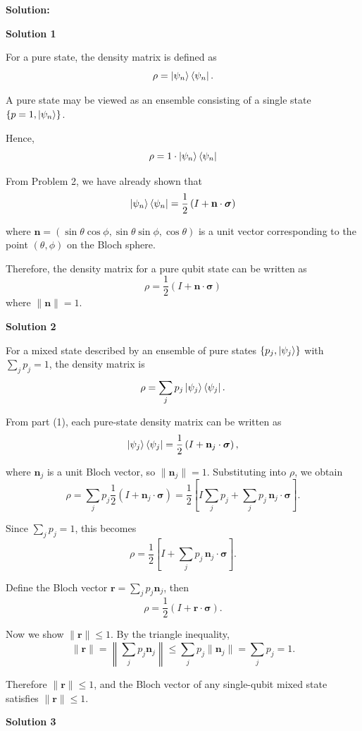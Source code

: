 \documentclass[11pt]{article}
\newenvironment{solution}
{\par\noindent\textbf{Solution:}\par}
{\vspace{1em}}
\begin{document}
\begin{solution}

\textbf{Solution 1}

For a pure state, the density matrix is defined as\[\rho = \ket{\psi_n}\bra{\psi_n}.\]
    
A pure state may be viewed as an ensemble consisting of a single state \(\{p=1, \ket{\psi_n}\}\).
    
Hence, \[\rho = 1\cdot \ket{\psi_n}\bra{\psi_n}\]
    
From Problem 2, we have already shown that \[\ket{\psi_n}\bra{\psi_n}=\frac12 \left(I+\mathbf n\cdot\boldsymbol{\sigma}\right)\]

where \(\mathbf n=(\sin\theta\cos\phi,\sin\theta\sin\phi,\cos\theta)\) is a unit vector corresponding to the point \((\theta,\phi)\) on the Bloch sphere.

Therefore, the density matrix for a pure qubit state can be written as \[\rho=\frac12\left(I+\mathbf n\cdot\boldsymbol{\sigma}\right)\]
where \(\boxed{\|\mathbf n\|=1}\).

\textbf{Solution 2}

For a mixed state described by an ensemble of pure states $\{p_j, \ket{\psi_j}\}$ with $\sum_j p_j=1$, the density matrix is \[\rho=\sum_j p_j \ket{\psi_j}\bra{\psi_j}.\]

From part (1), each pure-state density matrix can be written as \[\ket{\psi_j}\bra{\psi_j} = \frac12\left(I+\mathbf n_j\cdot\boldsymbol{\sigma}\right),\]

where $\mathbf n_j$ is a unit Bloch vector, so $\|\mathbf n_j\|=1$. Substituting into $\rho$, we obtain \[\rho = \sum_j p_j \frac12\left(I+\mathbf n_j\cdot\boldsymbol{\sigma}\right) = \frac12\left[I\sum_j p_j+\sum_j p_j\,\mathbf n_j\cdot\boldsymbol{\sigma}\right].\]

Since $\sum_j p_j=1$, this becomes \[\rho = \frac12\left[I+\sum_j p_j\,\mathbf n_j\cdot\boldsymbol{\sigma}\right].\]

Define the Bloch vector $\mathbf r=\sum_j p_j \mathbf n_j$, then \[\boxed{\rho=\frac12\left(I+\mathbf r\cdot\boldsymbol{\sigma}\right)}.\]

Now we show $\|\mathbf r\|\le 1$. By the triangle inequality, \[\|\mathbf r\| = \left\|\sum_j p_j \mathbf n_j\right\| \le \sum_j p_j \|\mathbf n_j\| = \sum_j p_j = 1.\]

Therefore $\boxed{\|\mathbf r\|\le 1}$, and the Bloch vector of any single-qubit mixed state satisfies $\|\mathbf r\|\le 1$.

\textbf{Solution 3}


\end{solution}
\end{document}
